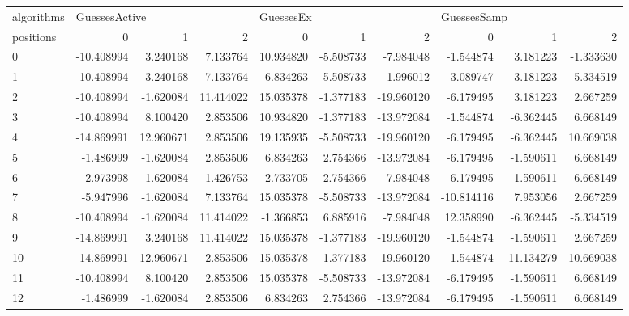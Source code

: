 \begin{table}
\begin{tabular}{lrrrrrrrrr}
\toprule
algorithms & \multicolumn{3}{l}{GuessesActive} & \multicolumn{3}{l}{GuessesEx} & \multicolumn{3}{l}{GuessesSamp} \\
positions &             0 &          1 &          2 &          0 &          1 &          2 &           0 &          1 &          2 \\
\midrule
0  &    -10.408994 &   3.240168 &   7.133764 &  10.934820 &  -5.508733 &  -7.984048 &   -1.544874 &   3.181223 &  -1.333630 \\
1  &    -10.408994 &   3.240168 &   7.133764 &   6.834263 &  -5.508733 &  -1.996012 &    3.089747 &   3.181223 &  -5.334519 \\
2  &    -10.408994 &  -1.620084 &  11.414022 &  15.035378 &  -1.377183 & -19.960120 &   -6.179495 &   3.181223 &   2.667259 \\
3  &    -10.408994 &   8.100420 &   2.853506 &  10.934820 &  -1.377183 & -13.972084 &   -1.544874 &  -6.362445 &   6.668149 \\
4  &    -14.869991 &  12.960671 &   2.853506 &  19.135935 &  -5.508733 & -19.960120 &   -6.179495 &  -6.362445 &  10.669038 \\
5  &     -1.486999 &  -1.620084 &   2.853506 &   6.834263 &   2.754366 & -13.972084 &   -6.179495 &  -1.590611 &   6.668149 \\
6  &      2.973998 &  -1.620084 &  -1.426753 &   2.733705 &   2.754366 &  -7.984048 &   -6.179495 &  -1.590611 &   6.668149 \\
7  &     -5.947996 &  -1.620084 &   7.133764 &  15.035378 &  -5.508733 & -13.972084 &  -10.814116 &   7.953056 &   2.667259 \\
8  &    -10.408994 &  -1.620084 &  11.414022 &  -1.366853 &   6.885916 &  -7.984048 &   12.358990 &  -6.362445 &  -5.334519 \\
9  &    -14.869991 &   3.240168 &  11.414022 &  15.035378 &  -1.377183 & -19.960120 &   -1.544874 &  -1.590611 &   2.667259 \\
10 &    -14.869991 &  12.960671 &   2.853506 &  15.035378 &  -1.377183 & -19.960120 &   -1.544874 & -11.134279 &  10.669038 \\
11 &    -10.408994 &   8.100420 &   2.853506 &  15.035378 &  -5.508733 & -13.972084 &   -6.179495 &  -1.590611 &   6.668149 \\
12 &     -1.486999 &  -1.620084 &   2.853506 &   6.834263 &   2.754366 & -13.972084 &   -6.179495 &  -1.590611 &   6.668149 \\

\end{tabular}
\end{table}
